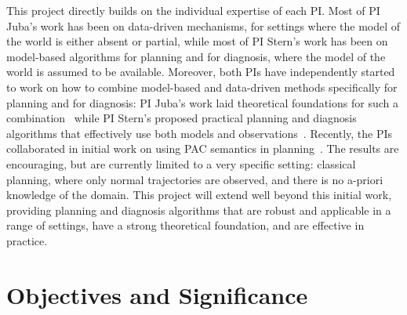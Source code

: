 \documentclass[12pt]{article}
\begin{document}



This project directly builds on the individual expertise of each PI. Most of PI Juba's work has been on data-driven mechanisms, for settings where the model of the world is either absent or partial, while most of PI Stern's work has been on model-based algorithms for planning and for diagnosis, where the model of the world is assumed to be available. Moreover, both PIs have independently started to work on how to combine model-based and data-driven methods specifically for planning and for diagnosis: PI Juba's work laid theoretical foundations for such a combination~\cite{juba2016aaai,juba2016jmlr} while PI Stern's proposed practical planning and diagnosis algorithms that effectively use both models and observations~\cite{elmishali2016dataAugmented,stern2011probably,stern2012search}. 
Recently, the PIs collaborated in initial work on using PAC semantics in planning~\cite{stern2017efficientAndSafe}. 
The results are encouraging, but are currently limited to a very specific setting: classical planning, where only normal trajectories are observed, 
and there is no a-priori knowledge of the domain. 
This project will extend well beyond this initial work, providing planning and diagnosis algorithms 
that are robust and applicable in a range of settings, have a strong theoretical foundation, and are effective in practice. 
 
 

\section{Objectives and Significance}
\end{document}
